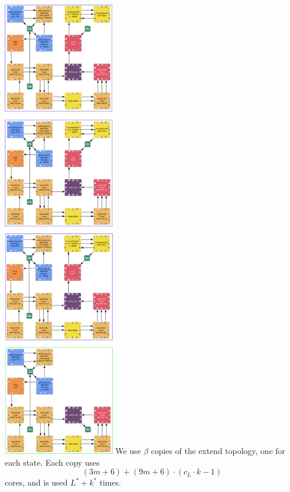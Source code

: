 \documentclass[../../fheimpl.tex]{subfiles}
\begin{document}
\includegraphics[width=\textwidth,height=8in,keepaspectratio]{graphics/extend.png}
We use $\beta$ copies of the extend topology, one for each state. Each copy uses
\[(3m+6)+(9m+6)\cdot(c_L\cdot k-1)\]
cores, and is used $L^*+k^*$ times.
\end{document}
